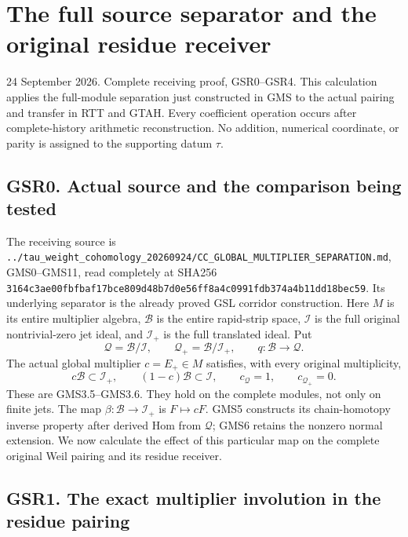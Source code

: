 \section{The full source separator and the original residue
receiver}\label{the-full-source-separator-and-the-original-residue-receiver}

24 September 2026. Complete receiving proof, GSR0--GSR4. This
calculation applies the full-module separation just constructed in GMS
to the actual pairing and transfer in RTT and GTAH. Every coefficient
operation occurs after complete-history arithmetic reconstruction. No
addition, numerical coordinate, or parity is assigned to the supporting
datum \(\tau\).

\subsection{GSR0. Actual source and the comparison being
tested}\label{gsr0.-actual-source-and-the-comparison-being-tested}

The receiving source is
\nolinkurl{../tau_weight_cohomology_20260924/CC_GLOBAL_MULTIPLIER_SEPARATION.md},
GMS0--GMS11, read completely at SHA256
\nolinkurl{3164c3ae00fbfbaf17bce809d48b7d0e56ff8a4c0991fdb374a4b11dd18bec59}.
Its underlying separator is the already proved GSL corridor
construction. Here \(M\) is its entire multiplier algebra,
\(\mathcal B\) is the entire rapid-strip space, \(\mathcal I\) is the
full original nontrivial-zero jet ideal, and \(\mathcal I_+\) is the
full translated ideal. Put \[
\mathcal Q=\mathcal B/\mathcal I,\qquad
\mathcal Q_+=\mathcal B/\mathcal I_+,\qquad
q:\mathcal B\longrightarrow\mathcal Q.
\tag{GSR0.1}
\] The actual global multiplier \(c=E_+\in M\) satisfies, with every
original multiplicity, \[
c\mathcal B\subset\mathcal I_+,\qquad
(1-c)\mathcal B\subset\mathcal I,\qquad
c_{\mathcal Q}=1,\qquad c_{\mathcal Q_+}=0.
\tag{GSR0.2}
\] These are GMS3.5--GMS3.6. They hold on the complete modules, not only
on finite jets. The map \(\beta:\mathcal B\to\mathcal I_+\) is
\(F\mapsto cF\). GMS5 constructs its chain-homotopy inverse property
after derived Hom from \(\mathcal Q\); GMS6 retains the nonzero normal
extension. We now calculate the effect of this particular map on the
complete original Weil pairing and its residue receiver.

\subsection{GSR1. The exact multiplier involution in the residue
pairing}\label{gsr1.-the-exact-multiplier-involution-in-the-residue-pairing}

